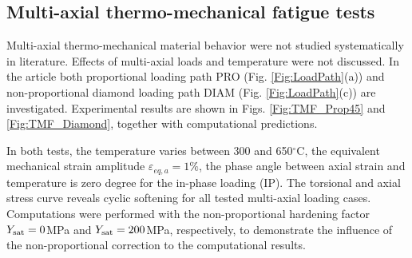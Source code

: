 \documentclass[preprint,5p,twocolumn,11pt,sort&compress]{elsarticle}
\begin{document}
\begin{figure*}
\caption{Experimental and computational results for the diamond strain path under in-phase thermo-mechanical loading conditions with varying temperature between  300 and 650$^{\circ}$C. (a) The first loading cycle. (b) The half life loading cycle. (c) Axial peak-valley normal stress as function of loading cycles. (d) Torsional peak-valley shear stress as function of  loading cycles.}
\label{Fig:TMF_Diamond}
\end{figure*}

\subsection{Multi-axial thermo-mechanical fatigue tests}
\noindent
Multi-axial thermo-mechanical material behavior were not studied systematically in literature. Effects of multi-axial loads and temperature were not discussed. In the article both proportional loading path PRO (Fig. \ref{Fig:LoadPath}(a)) and non-proportional diamond loading path DIAM (Fig. \ref{Fig:LoadPath}(c)) are investigated. Experimental results are shown in Figs. \ref{Fig:TMF_Prop45} and \ref{Fig:TMF_Diamond}, together with computational predictions.

In both tests, the temperature varies between 300 and 650$^{\circ}$C, the equivalent mechanical strain amplitude $\varepsilon_{eq,a}=1\%$, the phase angle between axial strain and temperature is zero degree for the in-phase loading (IP).
The torsional and axial stress curve reveals cyclic softening for all tested multi-axial loading cases.
Computations were performed with the non-proportional hardening factor $Y_{\rm sat}=0$MPa and $Y_{\rm sat}=200$MPa, respectively, to demonstrate the influence of the non-proportional correction to the computational results.
\end{document}
